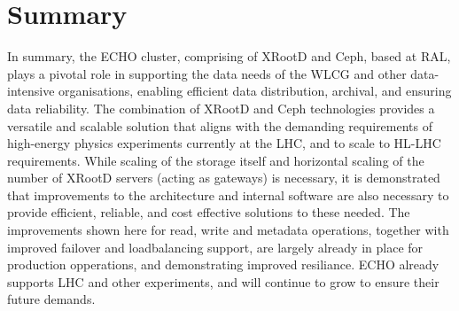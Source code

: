 \documentclass{webofc}
\begin{document}
\section{Summary\label{summary}}
In summary, the ECHO cluster, comprising of XRootD and Ceph, based at RAL, plays a pivotal role in supporting the data needs of the WLCG and other data-intensive organisations, enabling efficient data distribution, archival, and ensuring data reliability. The combination of XRootD and Ceph technologies provides a versatile and scalable solution that aligns with the demanding requirements of high-energy physics experiments currently at the LHC, and to scale to HL-LHC requirements. 
While scaling of the storage itself and horizontal scaling of the number of XRootD servers (acting as gateways) is necessary, it is demonstrated that improvements to the architecture and internal software are also necessary to provide efficient, reliable, and cost effective solutions to these needed. 
The improvements shown here for read, write and metadata operations, together with improved failover and loadbalancing support, are largely already in place for production opperations, and demonstrating improved resiliance. 
ECHO already supports LHC and other experiments, and will continue to grow to ensure their future demands. 



\end{document}
